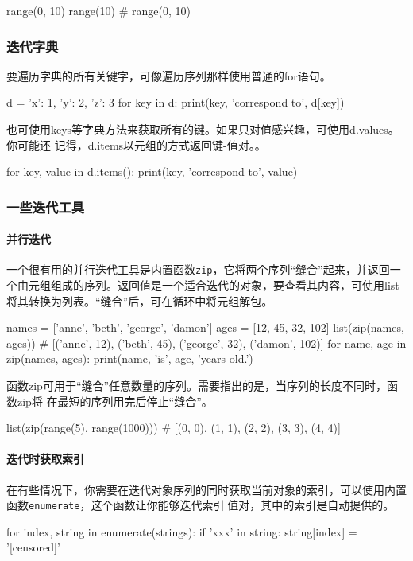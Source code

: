 \begin{pyc}
range(0, 10)
range(10)  # range(0, 10)
\end{pyc}
\subsubsection{迭代字典}
要遍历字典的所有关键字，可像遍历序列那样使用普通的for语句。
\begin{pyc}
d = {'x': 1, 'y': 2, 'z': 3}
for key in d:
    print(key, 'correspond to', d[key])
\end{pyc}
也可使用keys等字典方法来获取所有的键。如果只对值感兴趣，可使用d.values。你可能还
记得，d.items以元组的方式返回键-值对。。
\begin{pyc}
for key, value in d.items():
print(key, 'correspond to', value)
\end{pyc}
\subsubsection{一些迭代工具}
\paragraph{并行迭代} 一个很有用的并行迭代工具是内置函数\verb|zip|，它将两个序列“缝合”起来，并返回一个由元组组成的序列。返回值是一个适合迭代的对象，要查看其内容，可使用list将其转换为列表。“缝合”后，可在循环中将元组解包。
\begin{pyc}
names = ['anne', 'beth', 'george', 'damon']
ages = [12, 45, 32, 102]
list(zip(names, ages))
# [('anne', 12), ('beth', 45), ('george', 32), ('damon', 102)]
for name, age in zip(names, ages):
    print(name, 'is', age, 'years old.')
\end{pyc}
函数zip可用于“缝合”任意数量的序列。需要指出的是，当序列的长度不同时，函数zip将
在最短的序列用完后停止“缝合”。
\begin{pyc}
list(zip(range(5), range(1000)))
# [(0, 0), (1, 1), (2, 2), (3, 3), (4, 4)]
\end{pyc}

\paragraph{迭代时获取索引} 在有些情况下，你需要在迭代对象序列的同时获取当前对象的索引，可以使用内置函数\verb|enumerate|，这个函数让你能够迭代索引值对，其中的索引是自动提供的。
\begin{pyc}
for index, string in enumerate(strings):
if 'xxx' in string:
    string[index] = '[censored]'
\end{pyc}
